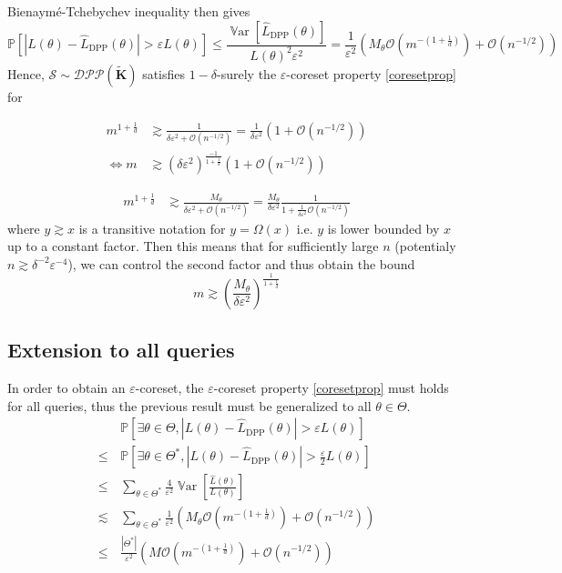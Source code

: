 \documentclass{article} %
\renewcommand{\epsilon}{\varepsilon}
\newcommand{\PP}{\mathbb{P}}
\newcommand{\OO}{\mathcal{O}}
\newcommand{\Var}{\operatorname{\mathbb V ar}}
\newcommand{\1}{\mathds{1}} %
\theoremstyle{definition} %
\begin{document}
Bienaym\'e-Tchebychev inequality then gives
\begin{equation}
	\PP \left[|L(\theta)-\hat L_{\textrm{DPP}}(\theta)|>\epsilon L(\theta)\right] \leq \frac{\Var[ \hat L_{\textrm{DPP}}(\theta) ] }{L(\theta)^{2}\varepsilon ^{2}} = \frac {1} {\epsilon^2}(M_\theta \OO( m ^{-(1+\frac 1 d)}) + \OO( n^{-1/2}))
\end{equation}
Hence, $\mathcal{S} \sim \mathcal{DPP}(\tilde{\boldsymbol K})$ satisfies $1-\delta$-surely the $\epsilon$-coreset property \ref{coresetprop} for
\begin{tcolorbox}
	\begin{align}
		m^{1+\frac 1 d} &\gtrsim \frac{1}{\delta \epsilon^2 + \OO(n^{-1/2})} = \frac 1 {\delta\epsilon^2} (1 +  \OO(n^{-1/2})) \\
		\iff m &\gtrsim (\delta\epsilon^2)^{\frac{-1}{1+\frac 1 d}} (1 +  \OO(n^{-1/2})) 
	\end{align} 
\end{tcolorbox}


\begin{align}
	m^{1+\frac 1 d} &\gtrsim \frac{M_\theta}{\delta \epsilon^2 + \OO(n^{-1/2})} = \frac {M_\theta} {\delta\epsilon^2} \frac{1}{1 + \frac{1}{\delta \epsilon^2}\OO(n^{-1/2})}
\end{align} 
where $y \gtrsim x$ is a transitive notation for $y = \Omega(x)$ i.e. $y$ is lower bounded by $x$ up to a constant factor.
Then this means that for sufficiently large $n$ (potentialy $n\gtrsim \delta^{-2} \epsilon^{-4}$), we can control the second factor and thus obtain the bound
\begin{equation}
	\boxed{m \gtrsim \left(\frac{M_\theta}{\delta\epsilon^2} \right)^{\frac{1}{1+\frac 1 d}} }
\end{equation}


\subsection{Extension to all queries}
In order to obtain an $\epsilon$-coreset, the $\epsilon$-coreset property \ref{coresetprop} must holds for all queries, thus the previous result must be generalized to all $\theta \in \Theta$.
\begin{align*}
	&\PP \left[ \exists \theta \in \Theta,  |L(\theta)-\hat L_{\textrm{DPP}}(\theta)|>\epsilon L(\theta)\right] \\
	\leq \,&\PP \left[ \exists \theta \in \Theta^*,  |L(\theta)-\hat L_{\textrm{DPP}}(\theta)|>\frac{\epsilon}{2} L(\theta)\right] \\
	\leq &\sum_{\theta \in \Theta^*} \frac{4}{\epsilon^2} \Var[\frac{\hat L(\theta)}{L(\theta)}] \\
	\lesssim &\sum_{\theta \in \Theta^*} \frac{1}{\epsilon^2}( M_\theta \OO(m^{-(1+\frac 1 d)}) + \OO(n^{-1/2})) \\
	\leq &\frac{|\Theta^*|}{\epsilon^2} (M \OO(m^{-(1+\frac 1 d)}) + \OO(n^{-1/2}))
\end{align*}
\end{document}
